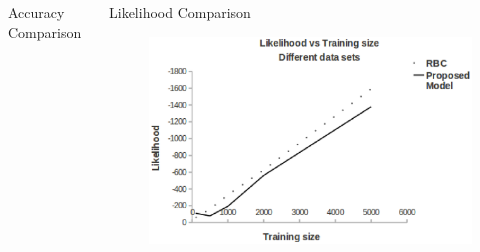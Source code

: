 \documentclass[10pt, blue,subsection=true, compress]{beamer}
\begin{document}
\begin{frame}
\begin{columns}[t]
\begin{block}{Accuracy Comparison}
\begin{figure}[htbp]
\end{figure}
\end{block}
\begin{block}{Likelihood Comparison}
\begin{figure}[htbp]
\centering
\includegraphics[scale=0.25]{img/ex2-lh.eps}
\label{fig:4.2}
\end{figure}
\end{block}
\end{columns}
\end{frame}
\end{document}
